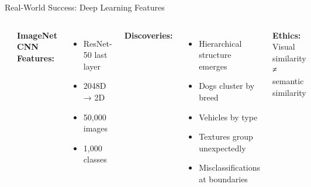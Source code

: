 \documentclass[aspectratio=169]{beamer}
\newcommand{\ethics}[1]{\colorbox{purple!10}{\textcolor{ethicscolor}{\textbf{Ethics:} #1}}}
\begin{document}
\begin{frame}{Real-World Success: Deep Learning Features}
\begin{columns}
\includegraphics[width=\textwidth]{./Figures/imagenet_tsne.png}

\textbf{ImageNet CNN Features:}
\begin{itemize}
\item ResNet-50 last layer
\item 2048D → 2D
\item 50,000 images
\item 1,000 classes
\end{itemize}

\textbf{Discoveries:}
\begin{itemize}
\item Hierarchical structure emerges
\item Dogs cluster by breed
\item Vehicles by type
\item Textures group unexpectedly
\item Misclassifications at boundaries
\end{itemize}

\ethics{Visual similarity ≠ semantic similarity}
\end{columns}
\end{frame}
\end{document}
